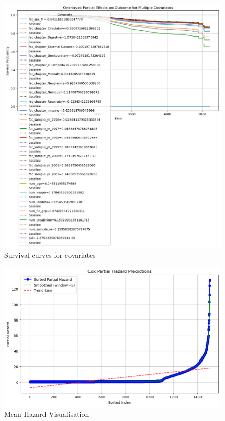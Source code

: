 \begin{figure}[h]
    \centering
    \includegraphics[width=\linewidth]{Figures/SURV/cox_overlay.png}
    \caption{Survival curves for covariates}
    \label{fig:your_label}
\end{figure}


\begin{figure}[h]
    \centering
    \includegraphics[width=\linewidth]{Figures/SURV/cox_hazard.png}
    \caption{Mean Hazard Visualisation}
    \label{fig:your_label}
\end{figure}


